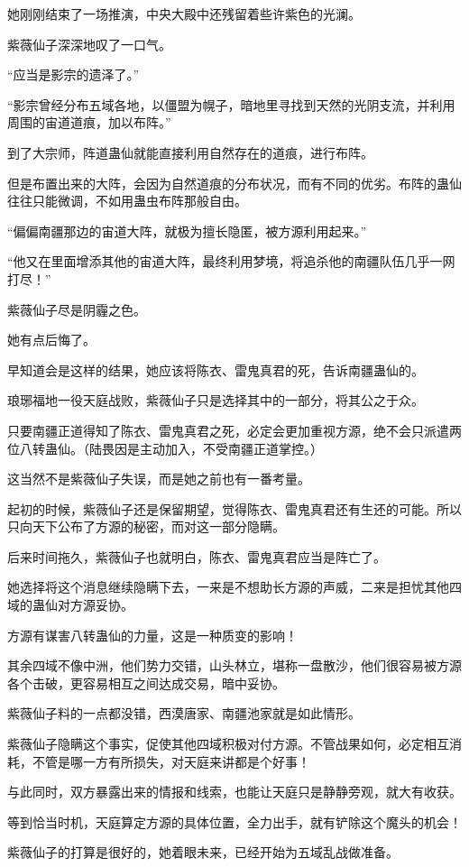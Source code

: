 \begin{this_body}
她刚刚结束了一场推演，中央大殿中还残留着些许紫色的光澜。

紫薇仙子深深地叹了一口气。

“应当是影宗的遗泽了。”

“影宗曾经分布五域各地，以僵盟为幌子，暗地里寻找到天然的光阴支流，并利用周围的宙道道痕，加以布阵。”

到了大宗师，阵道蛊仙就能直接利用自然存在的道痕，进行布阵。

但是布置出来的大阵，会因为自然道痕的分布状况，而有不同的优劣。布阵的蛊仙往往只能微调，不如用蛊虫布阵那般自由。

“偏偏南疆那边的宙道大阵，就极为擅长隐匿，被方源利用起来。”

“他又在里面增添其他的宙道大阵，最终利用梦境，将追杀他的南疆队伍几乎一网打尽！”

紫薇仙子尽是阴霾之色。

她有点后悔了。

早知道会是这样的结果，她应该将陈衣、雷鬼真君的死，告诉南疆蛊仙的。

琅琊福地一役天庭战败，紫薇仙子只是选择其中的一部分，将其公之于众。

只要南疆正道得知了陈衣、雷鬼真君之死，必定会更加重视方源，绝不会只派遣两位八转蛊仙。（陆畏因是主动加入，不受南疆正道掌控。）

这当然不是紫薇仙子失误，而是她之前也有一番考量。

起初的时候，紫薇仙子还是保留期望，觉得陈衣、雷鬼真君还有生还的可能。所以只向天下公布了方源的秘密，而对这一部分隐瞒。

后来时间拖久，紫薇仙子也就明白，陈衣、雷鬼真君应当是阵亡了。

她选择将这个消息继续隐瞒下去，一来是不想助长方源的声威，二来是担忧其他四域的蛊仙对方源妥协。

方源有谋害八转蛊仙的力量，这是一种质变的影响！

其余四域不像中洲，他们势力交错，山头林立，堪称一盘散沙，他们很容易被方源各个击破，更容易相互之间达成交易，暗中妥协。

紫薇仙子料的一点都没错，西漠唐家、南疆池家就是如此情形。

紫薇仙子隐瞒这个事实，促使其他四域积极对付方源。不管战果如何，必定相互消耗，不管是哪一方有所损失，对天庭来讲都是个好事！

与此同时，双方暴露出来的情报和线索，也能让天庭只是静静旁观，就大有收获。

等到恰当时机，天庭算定方源的具体位置，全力出手，就有铲除这个魔头的机会！

紫薇仙子的打算是很好的，她着眼未来，已经开始为五域乱战做准备。


\end{this_body}
